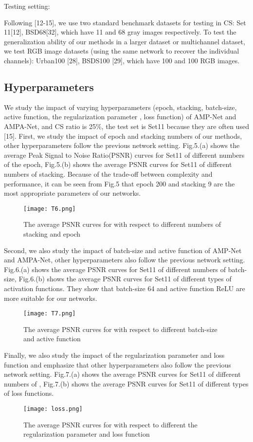 \documentclass[conference]{IEEEtran}
\begin{document}
\begin{bfseries} 
Testing setting:
\end{bfseries} 
Following [12-15], we use two standard benchmark datasets for testing in CS: Set 11[12], BSD68[32], which have 11 and 68 gray images respectively. To test the generalization ability of our methods in a larger dataset or multichannel dataset, we test RGB image datasets (using the same network to recover the individual channels): Urban100 [28], BSDS100 [29], which have 100 and 100 RGB images.

\subsection{Hyperparameters}

We study the impact of varying hyperparameters (epoch, stacking, batch-size, active function, the regularization parameter , loss function) of AMP-Net and AMPA-Net,  and CS ratio is {25\%}, the test set is Set11 because they are often used [15]. 
First, we study the impact of epoch and stacking numbers of our methods, other hyperparameters follow the previous network setting. Fig.5.(a) shows the average Peak Signal to Noise Ratio(PSNR) curves for Set11 of different numbers of the epoch, Fig.5.(b) shows the average PSNR curves for Set11 of different numbers of stacking. Because of the trade-off between complexity and performance, it can be seen from Fig.5 that epoch 200 and stacking 9 are the most appropriate parameters of our networks.
\begin{figure}[h]
\centering
\texttt{[image: T6.png]} \caption{The average PSNR curves for with respect to different numbers of stacking and epoch}
\label{T6} \end{figure}

Second, we also study the impact of batch-size and active function of AMP-Net and AMPA-Net, other hyperparameters also follow the previous network setting. Fig.6.(a) shows the average PSNR curves for Set11 of different numbers of batch-size, Fig.6.(b) shows the average PSNR curves for Set11 of different types of activation functions. They show that batch-size 64 and active function ReLU are more suitable for our networks.
\begin{figure}[h]
\centering
\texttt{[image: T7.png]} \caption{The average PSNR curves for with respect to different batch-size and active function}
\label{T7} \end{figure}
Finally, we also study the impact of the regularization parameter  and loss function and emphasize that other hyperparameters also follow the previous network setting. Fig.7.(a) shows the average PSNR curves for Set11 of different numbers of  , Fig.7.(b) shows the average PSNR curves for Set11 of different types of loss functions.
\begin{figure}[h]
\centering
\texttt{[image: loss.png]} \caption{The average PSNR curves for with respect to different the regularization parameter  and loss function}
\label{F3} \end{figure}
\end{document}
